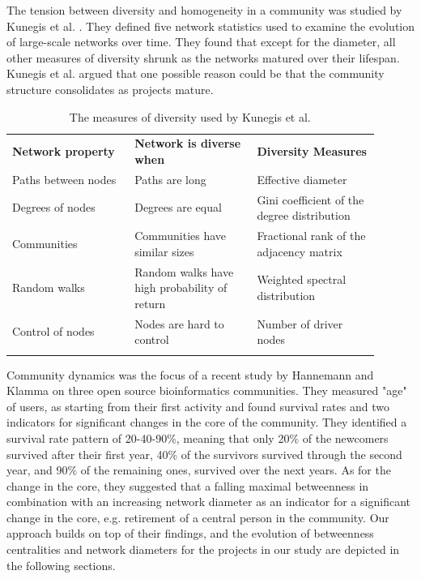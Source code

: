 \documentclass[conference]{IEEEtran}
\begin{document}
The tension between diversity and homogeneity in a community was studied by Kunegis et al. \cite{Kunegis}. They defined five network statistics used to examine the evolution of large-scale networks over time. They found that except for the diameter, all other measures of diversity shrunk as the networks matured over their lifespan. Kunegis et al. \cite{Kunegis} argued that one possible reason could be that the community structure consolidates as projects mature.\\

\begin{table}[!htbp]
\centering
\caption{The measures of diversity used by Kunegis et al. \cite{Kunegis}}
\label{TableDiversityMeasuresKunegisEtAl}
\begin{tabular}{p{0.3\linewidth} p{0.3\linewidth} p{0.3\linewidth}}
\hline\noalign{\smallskip}
\textbf{Network property} & \textbf{Network is diverse when} & \textbf{Diversity Measures} \\
\noalign{\smallskip}\hline\noalign{\smallskip}
Paths between nodes & Paths are long & Effective diameter \\ \hline
Degrees of nodes  & Degrees are equal & Gini coefficient of the degree distribution \\ \hline
Communities  & Communities have similar sizes & Fractional rank of the adjacency matrix \\ \hline
Random walks  & Random walks have high probability of return & Weighted spectral distribution \\ \hline
Control of nodes  & Nodes are hard to control & Number of driver nodes \\
\noalign{\smallskip}\hline
\end{tabular}
\end{table}

Community dynamics was the focus of a recent study by Hannemann and Klamma \cite{Hannemann} on three open source bioinformatics communities. They measured "age" of users, as starting from their first activity and found survival rates and two indicators for significant changes in the core of the community. They identified a survival rate pattern of 20-40-90\%, meaning that only 20\% of the newcomers survived after their first year, 40\% of the survivors survived through the second year, and 90\% of the remaining ones, survived over the next years. As for the change in the core, they suggested that a falling maximal betweenness in combination with an increasing network diameter as an indicator for a significant change in the core, e.g. retirement of a central person in the community. Our approach builds on top of their findings, and the evolution of betweenness centralities and network diameters for the projects in our study are depicted in the following sections.\\
\end{document}

